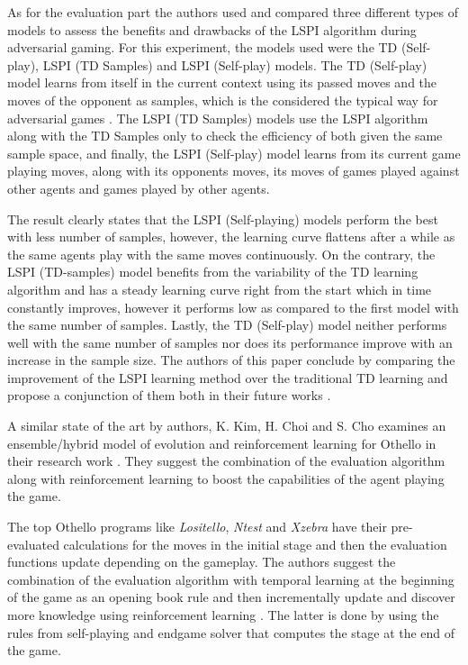 \documentclass{svproc}
\begin{document}
As for the evaluation part the authors used and compared three different types of models to assess the benefits and drawbacks of the LSPI algorithm during adversarial gaming. For this experiment, the models used were the TD (Self-play), LSPI (TD Samples) and LSPI (Self-play) models. The TD (Self-play) model learns from itself in the current context using its passed moves and the moves of the opponent as samples, which is the considered the typical way for adversarial games \cite{esmond_1}. The LSPI (TD Samples) models use the LSPI algorithm along with the TD Samples only to check the efficiency of both given the same sample space, and finally, the LSPI (Self-play) model learns from its current game playing moves, along with its opponents moves, its moves of games played against other agents and games played by other agents.

The result clearly states that the LSPI (Self-playing) models perform the best with less number of samples, however, the learning curve flattens after a while as the same agents play with the same moves continuously. On the contrary, the LSPI (TD-samples) model benefits from the variability of the TD learning algorithm and has a steady learning curve right from the start which in time constantly improves, however it performs low as compared to the first model with the same number of samples. Lastly, the TD (Self-play) model neither performs well with the same number of samples nor does its performance improve with an increase in the sample size. The authors of this paper conclude by comparing the improvement of the LSPI learning method over the traditional TD learning and propose a conjunction of them both in their future works \cite{esmond_1}.

A similar state of the art by authors, K. Kim, H. Choi and S. Cho examines an ensemble/hybrid model of evolution and reinforcement learning for Othello in their research work \cite{esmond_2}. They suggest the combination of the evaluation algorithm along with reinforcement learning to boost the capabilities of the agent playing the game.

The top Othello programs like \emph{Lositello}, \emph{Ntest} and \emph{Xzebra} have their pre-evaluated calculations for the moves in the initial stage and then the evaluation functions update depending on the gameplay. The authors suggest the combination of the evaluation algorithm with temporal learning at the beginning of the game as an opening book rule and then incrementally update and discover more knowledge using reinforcement learning \cite{esmond_2}. The latter is done by using the rules from self-playing and endgame solver that computes the stage at the end of the game.
\end{document}
